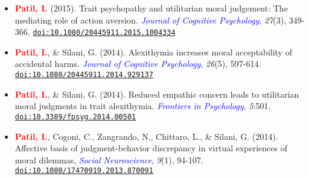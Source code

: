 \documentclass[10pt]{article}
\begin{document}
\begin{itemize}
	\item \textbf{\textcolor{red}{Patil, I.}} (2015). Trait psychopathy and utilitarian moral judgement: The mediating role of action aversion. \textit{\textcolor{blue}{Journal of Cognitive Psychology}}, \textit{27}(3), 349-366. \href{https://drive.google.com/file/d/0B6_u70YpdJKnQjVJUFgtR2ZmWTVqZGxRMEFfemVIOUVuME5Z/view?usp=sharing}{\tt doi:10.1080/20445911.2015.1004334}
	
	\item \textbf{\textcolor{red}{Patil, I.}}, \& Silani, G. (2014). Alexithymia increases moral acceptability of accidental harms. \textit{\textcolor{blue}{Journal of Cognitive Psychology}}, \textit{26}(5), 597-614. \href{https://drive.google.com/file/d/0B6_u70YpdJKnMU5pVHRUM3p0SFk/view?usp=sharing}{\tt doi:10.1080/20445911.2014.929137}
	
	\item \textbf{\textcolor{red}{Patil, I.}}, \& Silani, G. (2014). Reduced empathic concern leads to utilitarian moral judgments in trait alexithymia. \textit{\textcolor{blue}{Frontiers in Psychology}}, \textit{5}:501. \href{https://drive.google.com/file/d/0B6_u70YpdJKnUkJZR252dXBwcVk/view?usp=sharing}{\tt doi:10.3389/fpsyg.2014.00501}
	
	\item \textbf{\textcolor{red}{Patil, I.}}, Cogoni, C., Zangrando, N., Chittaro, L., \& Silani, G. (2014). {Affective basis of judgment-behavior discrepancy in virtual experiences of moral dilemmas}, \textit{\textcolor{blue}{Social Neuroscience}}, \textit{9}(1), 94-107. \\
	\href{https://drive.google.com/file/d/0B6_u70YpdJKnV3RIR2s2cWlFdVU/view?usp=sharing}{\tt doi:10.1080/17470919.2013.870091}
	
	\end{itemize}
	
%	
%	

	
\end{document}
